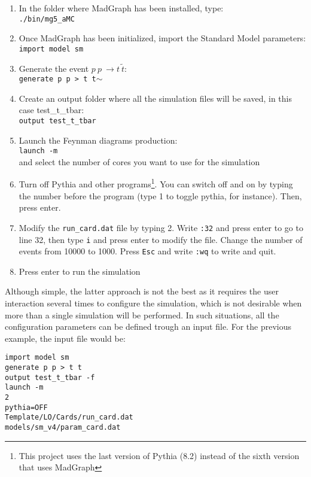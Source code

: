 \documentclass[12pt, oneside]{book}              %
\begin{document}
\begin{enumerate}
\item In the folder where MadGraph has been installed, type:  
\\ \texttt{./bin/mg5\_aMC}
\item Once MadGraph has been initialized, import the Standard Model parameters:
\\ \texttt{import model sm}
\item Generate the event $ p\ p\ \to t\ \tilde{t} $:
\\ \texttt{generate p p > t t$ \sim $}
\item Create an output folder where all the simulation files will be saved, in this case
test\_t\_tbar:
\\ \texttt{output test\_t\_tbar} 
\item Launch the Feynman diagrams production:
\\ \texttt{launch -m}
\\ and select the number of cores you want to use for the simulation
\item Turn off Pythia and other programs\footnote{This project uses the last version 
of Pythia (8.2) instead of the sixth version that uses MadGraph}. You can switch 
off and on by typing the number before the program (type 1 to toggle pythia, for instance).
Then, press enter.
\item Modify the \texttt{run\_card.dat} file by typing 2. Write \texttt{:32} and press
enter to go to line 32, then type \texttt{i} and press enter to modify the file. Change
the number of events from 10000 to 1000. Press \texttt{Esc} and write \texttt{:wq} to
write and quit.
\item Press enter to run the simulation

\end{enumerate}

Although simple, the latter approach is not the best as it requires the user interaction
several times to configure the simulation, which is not desirable when more than a single 
simulation will be performed. In such situations, all the configuration parameters
can be defined trough an input file. For the previous example, the input file would be:

\noindent \texttt{import model sm
\\generate p p > t t~
\\output test\_t\_tbar -f
\\launch -m
\\2
\\pythia=OFF
\\Template/LO/Cards/run\_card.dat
\\models/sm\_v4/param\_card.dat}
\end{document}
